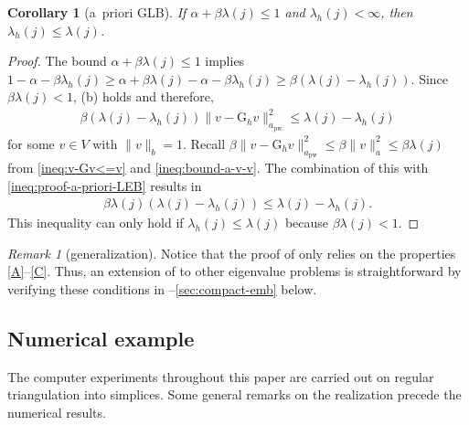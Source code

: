 \documentclass[a4paper]{amsart}
\numberwithin{equation}{section}
\newcommand{\pw}{\mathrm{pw}}
\newtheorem{corollary}[theorem]{Corollary}
\theoremstyle{remark}
\newtheorem{remark}[theorem]{Remark}
\theoremstyle{definition}
\theoremstyle{assumptionnoperiod}
\begin{document}
\begin{corollary}[a~priori GLB]\label{cor:a-priori}
	If $\alpha + \beta \lambda(j) \leq 1$ and $\lambda_h(j) < \infty$, then $\lambda_h(j) \leq \lambda(j)$.
\end{corollary}
\begin{proof}
	The bound $\alpha + \beta \lambda(j) \leq 1$ implies
	$1 - \alpha - \beta \lambda_h(j) \geq \alpha + \beta\lambda(j) - \alpha - \beta\lambda_h(j) \geq \beta(\lambda(j) - \lambda_h(j))$.
	Since $\beta \lambda(j) < 1$, (b) holds and therefore,
	\begin{align}\label{ineq:proof-a-priori-LEB}
		\beta(\lambda(j) - \lambda_h(j)) \|v - \mathrm{G}_h v\|_{a_\pw}^2 \leq \lambda(j) - \lambda_h(j)
	\end{align}
	for some $v \in V$ with $\|v\|_b = 1$.
	Recall $\beta \|v - \mathrm{G}_h v\|_{a_\pw}^2 \leq \beta \|v\|_a^2 \leq \beta \lambda(j)$
	from \eqref{ineq:v-Gv<=v} and \eqref{ineq:bound-a-v-v}.
	The combination of this with \eqref{ineq:proof-a-priori-LEB} results in
	\begin{align*}
		\beta \lambda(j)(\lambda(j) - \lambda_h(j)) \leq \lambda(j) - \lambda_h(j).
	\end{align*}
	This inequality can only hold if $\lambda_h(j) \leq \lambda(j)$ because $\beta \lambda(j) < 1$.
\end{proof}
\begin{remark}[generalization]
	Notice that the proof of  only relies on the properties \ref{A}--\ref{C}. Thus, an extension of  to other eigenvalue problems is straightforward by verifying these conditions in --\ref{sec:compact-emb} below.
\end{remark}
\subsection{Numerical example}
The computer experiments throughout this paper are carried out on regular triangulation into simplices.
Some general remarks on the realization precede the numerical results.
\end{document}
